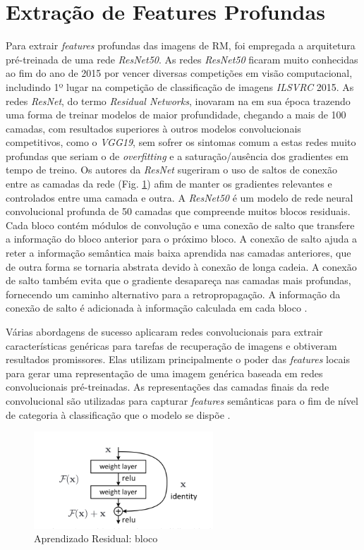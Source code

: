 \section{Extração de Features Profundas}
Para extrair \textit{features} profundas das imagens de RM, foi empregada a arquitetura pré-treinada de uma rede \textit{ResNet50}. As redes \textit{ResNet50} ficaram muito conhecidas ao fim do ano de 2015 por vencer diversas competições em visão computacional, includindo 1º lugar na competição de classificação de imagens \textit{ILSVRC} 2015. As redes \textit{ResNet}, do termo \textit{Residual Networks}, inovaram na em sua época trazendo uma forma de treinar modelos de maior profundidade, chegando a mais de 100 camadas, com resultados superiores à outros modelos convolucionais competitivos, como o \textit{VGG19}, sem sofrer os sintomas comum a estas redes muito profundas que seriam o de \textit{overfitting} e a saturação/ausência dos gradientes em tempo de treino. Os autores da \textit{ResNet} sugeriram o uso de saltos de conexão entre as camadas da rede (Fig. \ref{fig:fig003}) afim de manter os gradientes relevantes e controlados entre uma camada e outra.  A \textit{ResNet50} é um modelo de rede neural convolucional profunda de 50 camadas que compreende muitos blocos residuais. Cada bloco contém módulos de convolução e uma conexão de salto que transfere a informação do bloco anterior para o próximo bloco. A conexão de salto ajuda a reter a informação semântica mais baixa aprendida nas camadas anteriores, que de outra forma se tornaria abstrata devido à conexão de longa cadeia. A conexão de salto também evita que o gradiente desapareça nas camadas mais profundas, fornecendo um caminho alternativo para a retropropagação. A informação da conexão de salto é adicionada à informação calculada em cada bloco \cite{heDeepResidualLearning2015}.

Várias abordagens de sucesso aplicaram redes convolucionais para extrair características genéricas para tarefas de recuperação de imagens e obtiveram resultados promissores. Elas utilizam principalmente o poder das \textit{features} locais para gerar uma representação de uma imagem genérica baseada em redes convolucionais pré-treinadas. As representações das camadas finais da rede convolucional são utilizadas para capturar \textit{features} semânticas para o fim de nível de categoria à classificação que o modelo se dispõe \cite{alzubiContentbasedImageRetrieval2017b}.

\begin{figure}[htbp]
    \centering
    \includegraphics[width=0.6\textwidth]{figures/fig003.png}
    \caption{Aprendizado Residual: bloco}
    \label{fig:fig003}
\end{figure}

